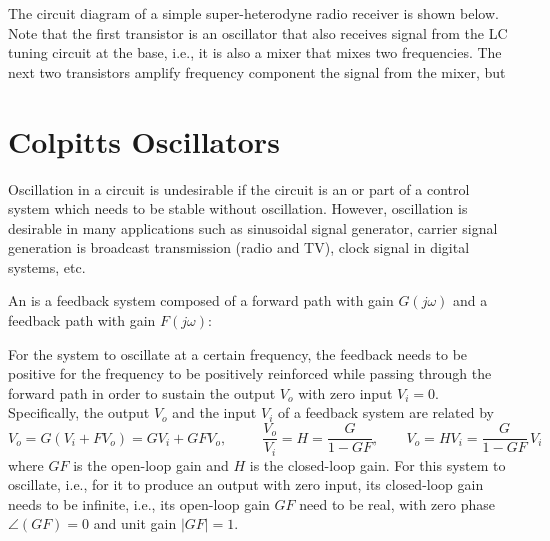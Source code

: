 \documentclass{article}
\begin{document}
\begin{itemize}

The circuit diagram of a simple super-heterodyne radio receiver is shown below.
Note that the first transistor is an oscillator that also receives signal from
the LC tuning circuit at the base, i.e., it is also a mixer that mixes two
frequencies. The next two transistors amplify frequency component the signal from the mixer, but



\end{itemize}



\section{Colpitts Oscillators}

Oscillation in a circuit is undesirable if the circuit is an
or part of a control system which needs to be stable without oscillation.
However, oscillation is desirable in many applications such as sinusoidal
signal generator, carrier signal generation is broadcast transmission
(radio and TV), clock signal in digital systems, etc.

An 
is a feedback system composed of a forward path with gain $G(j\omega)$ 
and a feedback path with gain $F(j\omega)$:


For the system to oscillate at a certain frequency, the feedback 
needs to be positive for the frequency to be positively reinforced
while passing through the forward path in order to sustain the output
$V_o$ with zero input $V_i=0$. Specifically, the output $V_o$ and the 
input $V_i$ of a feedback system are related by
\begin{equation}
V_o=G(V_i+FV_o)=GV_i+GFV_o,\;\;\;\;\;\;\;\;\;\frac{V_o}{V_i}=H=\frac{G}{1-GF},
\;\;\;\;\;\;\;V_o=HV_i=\frac{G}{1-GF}\,V_i
\end{equation}
where $GF$ is the open-loop gain and $H$ is the closed-loop gain.
For this system to oscillate, i.e., for it to produce an output with
zero input, its closed-loop gain needs to be infinite, i.e., its 
open-loop gain $GF$ need to be real, with zero phase $\angle(GF)=0$
and unit gain $|GF|=1$. 

\end{document}
